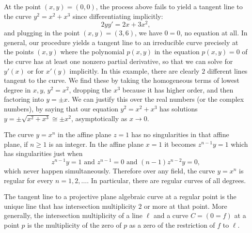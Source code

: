 \begin{example}
At the point \((x,y)=(0,0)\), the process above fails to yield a tangent line to the curve \(y^2=x^2+x^3\) since differentiating implicitly:
\[
2yy' = 2x + 3x^2,
\]
and plugging in the point \((x,y)=(3,6)\), we have \(0=0\), no equation at all.
In general, our procedure yields a tangent line to an irreducible curve precisely at the points \((x,y)\) where the polynomial \(p(x,y)\) in the equation \(p(x,y)=0\) of the curve has at least one nonzero partial derivative, so that we can solve for \(y'(x)\) or for \(x'(y)\) implicitly.
In this example, 
there are clearly \(2\) different lines tangent to the curve.
We find these by taking the homogeneous terms of lowest degree in \(x,y\), \(y^2=x^2\), dropping the \(x^3\) because it has higher order, and then factoring into \(y=\pm x\).
We can justify this over the real numbers (or the complex numbers), by saying that our equation \(y^2=x^2+x^3\) has solutions \(y=\pm \sqrt{x^2+x^3} \cong \pm x^2\), asymptotically as \(x \to 0\). 
\end{example}
\begin{example}
The curve \(y=x^n\) in the affine plane \(z=1\) has no singularities in that affine plane, if \(n \ge 1\) is an integer.
In the affine plane \(x=1\) it becomes \(z^{n-1}y=1\) which has singularities just when 
\[
z^{n-1}y=1 \text{ and } z^{n-1}=0 \text{ and } (n-1)z^{n-2} y = 0,
\]
which never happen simultaneously.
Therefore over any field, the curve \(y=x^n\) is regular for every \(n=1, 2, \dots\).
In particular, there are regular curves of all degrees.
\end{example}
\begin{theorem}\label{theorem:tangent.intersection}
The tangent line to a projective plane algebraic curve at a regular point is the unique line that has intersection multiplicity \(2\) or more at that point.
More generally, the intersection multiplicity of a line \(\ell\) and a curve \(C=(0=f)\) at a point \(p\) is the multiplicity of the zero of \(p\) as a zero of the restriction of \(f\) to \(\ell\).
\end{theorem}

